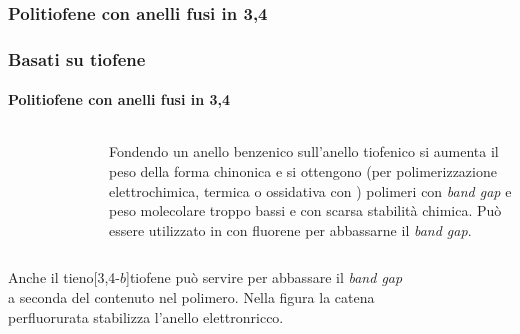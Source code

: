 \subsubsection{Politiofene con anelli fusi in 3,4}\begin{frame}\frametitle{Basati su tiofene}\framesubtitle{Politiofene con anelli fusi in 3,4}
\begin{columns}
\begin{figure}{}\end{figure}
Fondendo un anello benzenico sull'anello tiofenico si aumenta il peso della forma chinonica e si ottengono (per polimerizzazione elettrochimica, termica o ossidativa con ) polimeri con \emph{band gap} e peso molecolare troppo bassi e con scarsa stabilità chimica. Può essere utilizzato in con fluorene per abbassarne il \emph{band gap}.
\end{columns}
\vspace{10pt}\begin{columns}
Anche il tieno[3,4-$b$]tiofene può servire per abbassare il \emph{band gap} a seconda del contenuto nel polimero. Nella figura la catena perfluorurata stabilizza l'anello elettronricco.
\vspace{-20pt}\begin{figure}{}\end{figure}
\end{columns}
\end{frame}



